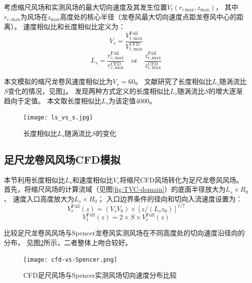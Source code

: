 考虑缩尺风场和实测风场的最大切向速度及其发生位置$V_t(r_{c\,\mathrm{max}}, z_{\mathrm{max}})$，
其中$r_{c,\mathrm{max}}$为风场在$z_{\mathrm{max}}$高度处的核心半径（龙卷风最大切向速度点距龙卷风中心的距离）。
速度相似比和长度相似比定义为\cite{hangan2008swirl}：
\begin{equation}
	V_s  =  \frac{V_{t,\mathrm{max}}^{\text{Full}}}{V_{t,\mathrm{max}}^{\text{CFD}}}
\end{equation}
\begin{equation}
	L_s  =  \frac{r_{c,\mathrm{max}}^{\text{Full}}}{r_{c,\mathrm{max}}^{\text{CFD}}} \quad \text{or} \quad \frac{z_{c,\mathrm{max}}^{\text{Full}}}{z_{c,\mathrm{max}}^{\text{CFD}}}
\end{equation}

本文模拟的缩尺龙卷风速度相似比为$V_s=60$。
文献\cite{hangan2008swirl}研究了长度相似比$L_s$随涡流比$S$变化的情况，见图\ref{fig:Ls-S}。
发现两种方式定义的长度相似比$L_s$随涡流比$S$的增大逐渐趋向于定值。
本文取长度相似比$L_s$为该定值$4000$。

\begin{figure}[!htbp]
	\centering
	\texttt{[image: ls\_vs\_s.jpg]}
	\caption{长度相似比$L_s$随涡流比$S$的变化\cite{hangan2008swirl}}
	\label{fig:Ls-S}
\end{figure}

\subsection{足尺龙卷风风场CFD模拟}\label{sec:full-tornado}

本节利用长度相似比$L_s$和速度相似比$V_s$将缩尺CFD风场转化为足尺龙卷风风场。
首先，将缩尺风场的计算流域（见图\ref{fig:TVC-domain}）的底面半径放大为$L_s\times R_0$、
速度入口高度放大为$L_s \times H_0$；
入口边界条件的径向和切向入流速度设置为：
\begin{equation}
	V_r^{\text{Full}}(z) = (V_s V_0)\times\left[z/(L_s z_0)\right]^{1/7}
\end{equation}
\begin{equation}
	V_t^{\text{Full}}(z) = 2 \times S \times V_r^{\text{Full}}(z)
\end{equation}

比较足尺龙卷风风场与Spencer龙卷风实测风场在不同高度处的切向速度沿径向的分布，
见图\ref{fig:cfd-Spencer}所示，二者整体上吻合较好。

\begin{figure}[!htbp]
	\centering
	\texttt{[image: cfd-vs-Spencer.png]}
	\caption{CFD足尺风场与Spencer实测风场切向速度分布比较}
	\label{fig:cfd-Spencer}
\end{figure}
